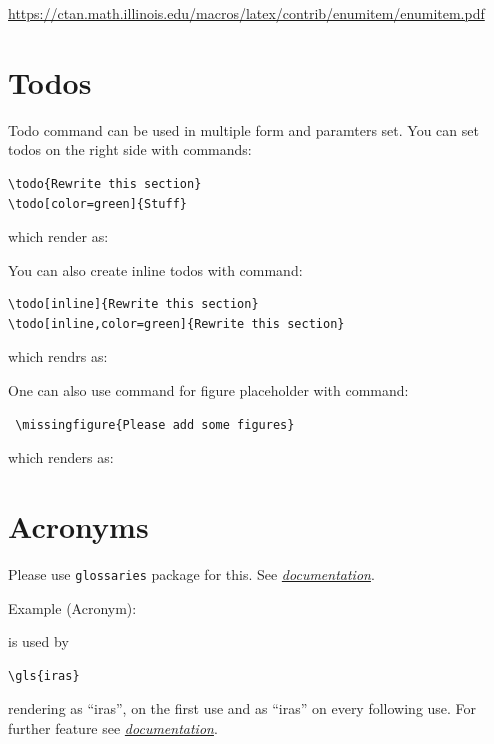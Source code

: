 \url{https://ctan.math.illinois.edu/macros/latex/contrib/enumitem/enumitem.pdf}

\section{Todos}

Todo command can be used in multiple form and paramters set. You can set todos on the right side with commands:
{\small
\begin{verbatim}
\todo{Rewrite this section}
\todo[color=green]{Stuff}
\end{verbatim}
} which render as:




You can also create inline todos with command:
{\small
\begin{verbatim}
\todo[inline]{Rewrite this section}
\todo[inline,color=green]{Rewrite this section}
\end{verbatim}
} which rendrs as:

One can also use command for figure placeholder with command:
{\small
\begin{verbatim}
 \missingfigure{Please add some figures}
\end{verbatim}
} which renders as:


\section{Acronyms}
Please use \texttt{glossaries} package for this. See \href{https://en.wikibooks.org/wiki/LaTeX/Glossary}{\textit{documentation}}.

Example (Acronym):
{\small
\begin{spverbatim}
\end{spverbatim}
} 
is used by
{\small
\begin{verbatim}
\gls{iras}
\end{verbatim}
}
rendering as ``\gls{iras}'', on the first use and as ``\gls{iras}'' on every following use. For further feature see \href{https://en.wikibooks.org/wiki/LaTeX/Glossary}{\textit{documentation}}.


